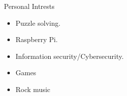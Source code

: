 \documentclass{resume} %
\begin{document}
\begin{rSection}{Personal Intrests} %
    \begin{multicols}{3}
        \begin{itemize}
            \item Puzzle solving.
            \item Raspberry Pi.
            \item Information security/Cybersecurity.
            \item Games
            \item Rock music
        \end{itemize}
        \end{multicols}


\end{rSection}



\end{document}
